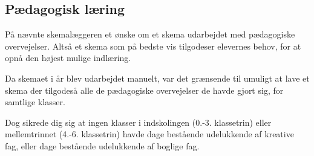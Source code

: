 \subsection{Pædagogisk læring}
\label{paedagogisk_laering}
På \school nævnte skemalæggeren et ønske om et skema udarbejdet med pædagogiske overvejelser. Altså et skema som på bedste vis tilgodeser elevernes behov, for at opnå den højest mulige indlæring.

Da skemaet i år blev udarbejdet manuelt, var det grænsende til umuligt at lave et skema der tilgodeså alle de pædagogiske overvejelser de havde gjort sig, for samtlige klasser.

Dog sikrede dig sig at ingen klasser i indskolingen (0.-3. klassetrin) eller mellemtrinnet (4.-6. klassetrin) havde dage bestående udelukkende af kreative fag, eller dage bestående udelukkende af boglige fag. 